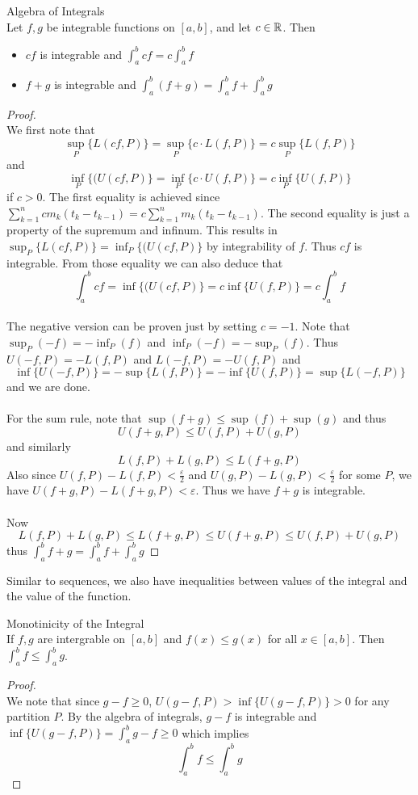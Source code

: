\documentclass[a4paper]{article}
\begin{document}
\begin{thm}{Algebra of Integrals}{}\\ Let $f,g$ be integrable functions on $[a,b]$, and let $c\in\mathbb{R}$. Then
\begin{itemize}
\item $cf$ is integrable and $\int_{a}^{b}cf=c\int_{a}^{b}f$
\item $f+g$ is integrable and $\int_{a}^{b}(f+g)=\int_{a}^{b}f+\int_{a}^{b}g$
\end{itemize}
\begin{proof}\\ We first note that $$\sup_P\{L(cf,P)\}=\sup_P\{c\cdot L(f,P)\}=c\sup_P\{L(f,P)\}$$ and $$\inf_P\{(U(cf,P)\}=\inf_P\{c\cdot U(f,P)\}=c\inf_P\{U(f,P)\}$$ if $c>0$. The first equality is achieved since $\sum_{k=1}^ncm_k(t_k-t_{k-1})=c\sum_{k=1}^nm_k(t_k-t_{k-1})$. The second equality is just a property of the supremum and infinum. This results in $\sup_P\{L(cf,P)\}=\inf_P\{(U(cf,P)\}$ by integrability of $f$. Thus $cf$ is integrable. From those equality we can also deduce that $$\int_a^bcf=\inf\{(U(cf,P)\}=c\inf\{U(f,P)\}=c\int_a^bf$$
\\
The negative version can be proven just by setting $c=-1$. Note that $\sup_P(-f)=-\inf_P(f)$ and $\inf_P(-f)=-\sup_P(f)$. Thus $U(-f,P)=-L(f,P)$ and $L(-f,P)=-U(f,P)$ and $$\inf\{U(-f,P)\}=-\sup\{L(f,P)\}=-\inf\{U(f,P)\}=\sup\{L(-f,P)\}$$ and we are done. \\~\\
For the sum rule, note that $\sup(f+g)\leq\sup(f)+\sup(g)$ and thus $$U(f+g,P)\leq U(f,P)+U(g,P)$$ and similarly $$L(f,P)+L(g,P)\leq L(f+g,P)$$ Also since $U(f,P)-L(f,P)<\frac{\varepsilon}{2}$ and $U(g,P)-L(g,P)<\frac{\varepsilon}{2}$ for some $P$, we have $U(f+g,P)-L(f+g,P)<\varepsilon$. Thus we have $f+g$ is integrable. \\~\\
Now $$L(f,P)+L(g,P)\leq L(f+g,P)\leq U(f+g,P)\leq U(f,P)+U(g,P)$$ thus $\int_a^bf+g=\int_a^bf+\int_a^bg$
\end{proof}
\end{thm}

Similar to sequences, we also have inequalities between values of the integral and the value of the function. 

\begin{thm}{Monotinicity of the Integral}{}\\ If $f,g$ are intergrable on $[a,b]$ and $f(x)\leq g(x)$ for all $x\in[a,b]$. Then $\int_{a}^{b}f\leq\int_{a}^{b}g$. 
\begin{proof}\\ We note that since $g-f\geq 0$, $U(g-f,P)>\inf\{U(g-f,P)\}>0$ for any partition $P$. By the algebra of integrals, $g-f$ is integrable and $\inf\{U(g-f,P)\}=\int_a^bg-f\geq 0$ which implies $$\int_a^bf\leq\int_a^bg$$
\end{proof}
\end{thm}
\end{document}
